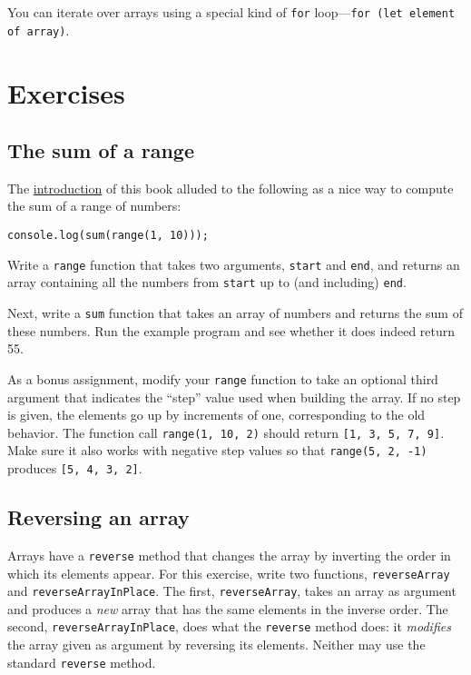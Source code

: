 You can iterate over arrays using a special kind of \lstinline`for` loop—\lstinline`for (let element of array)`.

\section{Exercises}

\subsection{The sum of a range}

The \hyperref[intro]{introduction} of this book alluded to the following as a nice way to compute the sum of a range of numbers:

\begin{lstlisting}
console.log(sum(range(1, 10)));
\end{lstlisting}
\noindent{}

Write a \lstinline`range` function that takes two arguments, \lstinline`start` and \lstinline`end`, and returns an array containing all the numbers from \lstinline`start` up to (and including) \lstinline`end`.

Next, write a \lstinline`sum` function that takes an array of numbers and returns the sum of these numbers. Run the example program and see whether it does indeed return 55.

As a bonus assignment, modify your \lstinline`range` function to take an optional third argument that indicates the ``step'' value used when building the array. If no step is given, the elements go up by increments of one, corresponding to the old behavior. The function call \lstinline`range(1, 10, 2)` should return \lstinline`[1, 3, 5, 7, 9]`. Make sure it also works with negative step values so that \lstinline`range(5, 2, -1)` produces \lstinline`[5, 4, 3, 2]`.

\subsection{Reversing an array}

Arrays have a \lstinline`reverse` method that changes the array by inverting the order in which its elements appear. For this exercise, write two functions, \lstinline`reverseArray` and \lstinline`reverseArrayInPlace`. The first, \lstinline`reverseArray`, takes an array as argument and produces a \emph{new} array that has the same elements in the inverse order. The second, \lstinline`reverseArrayInPlace`, does what the \lstinline`reverse` method does: it \emph{modifies} the array given as argument by reversing its elements. Neither may use the standard \lstinline`reverse` method.

